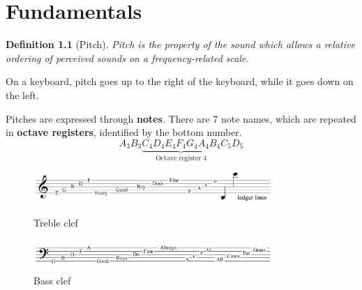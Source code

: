 \documentclass{book}
\newtheorem{definition}{Definition}
\begin{document}
    \chapter{Fundamentals}
    \begin{definition}[Pitch]
        Pitch is the property of the sound which allows a relative ordering of perceived sounds on a frequency-related scale.
    \end{definition}
    On a keyboard, pitch goes up to the right of the keyboard, while it goes down on the left.

    Pitches are expressed through \textbf{notes}. There are 7 note names, which are repeated in \textbf{octave registers}, identified by the bottom number.
    $$A_3 B_3 \underbrace{C_4 D_4 E_4 F_4 G_4 A_4 B_4}_{\text{Octave register 4}} C_5 D_5$$

    \begin{figure}
        \begin{center}
            \includegraphics[width=0.8\textwidth]{img/treble}
            \caption{Treble clef}
            \includegraphics[width=0.8\textwidth]{img/bass}
            \caption{Bass clef}
        \end{center}
    \end{figure}
\end{document}
